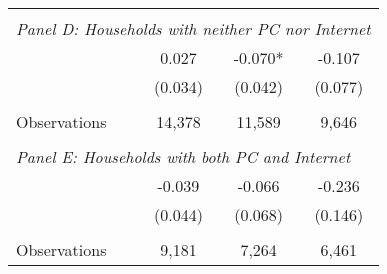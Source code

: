 {\begin{tabular}{lccc}
&  &  &   \\
\multicolumn{4}{l}{\textit{Panel D: Households with neither PC nor Internet}} \\
\hspace{3mm}        &       0.027   &      -0.070*  &      -0.107   \\
                    &     (0.034)   &     (0.042)   &     (0.077)   \\
                    &               &               &               \\
\hspace{3mm}Observations&      14,378   &      11,589   &       9,646   \\
 
&  &  &   \\
\multicolumn{4}{l}{\textit{Panel E: Households with both PC and Internet}} \\
\hspace{3mm}        &      -0.039   &      -0.066   &      -0.236   \\
                    &     (0.044)   &     (0.068)   &     (0.146)   \\
                    &               &               &               \\
\hspace{3mm}Observations&       9,181   &       7,264   &       6,461   \\
 

\bottomrule
\end{tabular}
}
